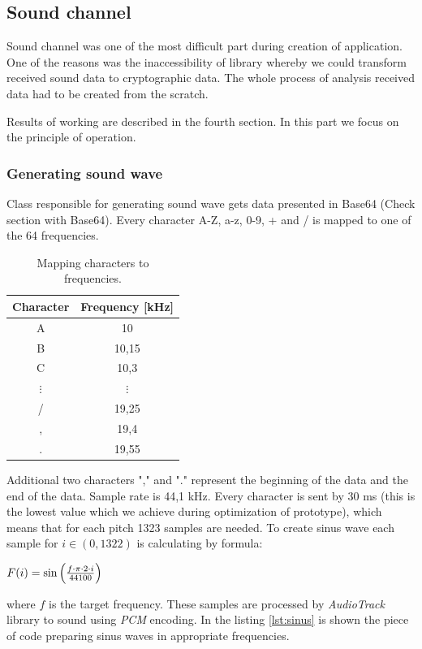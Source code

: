 \documentclass[11pt,titlepage]{article}
\theoremstyle{plain}
\begin{document}
\subsection{Sound channel}

Sound channel was one of the most difficult part during creation of application. One of the reasons was the inaccessibility of library whereby we could transform received sound data to cryptographic data. The whole process of analysis received data had to be created from the scratch.  Results of working are described in the fourth section. In this part we focus on the principle of operation.

\subsubsection{Generating sound wave}

Class responsible for generating sound wave gets data presented in Base64 (Check section with Base64). Every character A-Z, a-z, 0-9, + and / is mapped to one of the 64 frequencies.
\begin{table}
	\centering
	\begin{tabular}{| c | c |}
		\hline
		Character & Frequency [kHz] \\
		\hline
		A & 10 \\
		\hline
		B & 10,15 \\
		\hline
		C & 10,3 \\
		\hline
		$\vdots$ & $\vdots$ \\
		\hline
		/ & 19,25 \\
		\hline
		, & 19,4 \\
		\hline
		. & 19,55 \\
		\hline
	\end{tabular}
	\caption{Mapping characters to frequencies.}
\end{table}



Additional two characters "," and "." represent the beginning of the data and the end of the data. Sample rate is 44,1 kHz. Every character is sent by 30 ms (this is the lowest value which we achieve during optimization of prototype), which means that for each pitch 1323 samples are needed. To create sinus wave each sample for $ i \in (0,1322) $ is calculating by formula:
\begin{center}
$F(i) = \sin\left( f \cdot \pi \cdot 2 \cdot i  \over 44 100  \right)$
\end{center}
where $f$ is the target frequency.
These samples are processed by \textit{AudioTrack} library to sound using \textit{PCM} encoding. In the listing \ref{lst:sinus} is shown the piece of code preparing sinus waves in appropriate frequencies.
\end{document}
